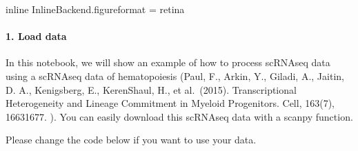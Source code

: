\documentclass[letterpaper,10pt,english]{sphinxmanual}
\begin{document}
{
\begin{sphinxVerbatim}[commandchars=\\\{\}]
\llap{\color{nbsphinxin}[2]:\,\hspace{\fboxrule}\hspace{\fboxsep}} inline
 InlineBackend.figure\PYGZus{}format = \PYGZsq{}retina\PYGZsq{}
\PYG{p}{[}\PYG{p}{]}  
\PYG{p}{[}\PYG{p}{]}  \PYG{p}{[} \PYG{p}{]}
\end{sphinxVerbatim}
}


\paragraph{1. Load data}
\label{\detokenize{notebooks/03_scRNA-seq_data_preprocessing/scanpy_preprocessing_with_Paul_etal_2015_data:1.-Load-data}}
In this notebook, we will show an example of how to process scRNA\sphinxhyphen{}seq data using a scRNA\sphinxhyphen{}seq data of hematopoiesis (Paul, F., Arkin, Y., Giladi, A., Jaitin, D. A., Kenigsberg, E., Keren\sphinxhyphen{}Shaul, H., et al. (2015). Transcriptional Heterogeneity and Lineage Commitment in Myeloid Progenitors. Cell, 163(7), 1663\textendash{}1677. ). You can easily download this scRNA\sphinxhyphen{}seq data with a scanpy function.

Please change the code below if you want to use your data.

{
\begin{sphinxVerbatim}[commandchars=\\\{\}]
\llap{\color{nbsphinxin}[3]:\,\hspace{\fboxrule}\hspace{\fboxsep}}
  
\end{sphinxVerbatim}
}
\end{document}
